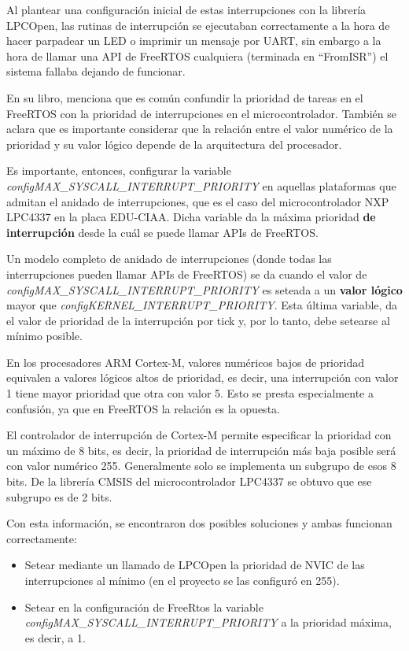 \documentclass{IEEEtran}
\begin{document}
Al plantear una configuración inicial de estas interrupciones con la librería LPCOpen, las rutinas de interrupción se ejecutaban correctamente a la hora de hacer parpadear un LED o imprimir un mensaje por UART, sin embargo a la hora de llamar una API de FreeRTOS cualquiera (terminada en ``FromISR'') el sistema fallaba dejando de funcionar.

En su libro, \textcite{FreeRTOS} menciona que es común confundir la prioridad de tareas en el FreeRTOS con la prioridad de interrupciones en el microcontrolador. También se aclara que es importante considerar que la relación entre el valor numérico de la prioridad y su valor lógico depende de la arquitectura del procesador.

Es importante, entonces, configurar la variable \textit{configMAX\_SYSCALL\_INTERRUPT\_PRIORITY} en aquellas plataformas que admitan el anidado de interrupciones, que es el caso del microcontrolador NXP LPC4337 en la placa EDU-CIAA. Dicha variable da la máxima prioridad \textbf{de interrupción} desde la cuál se puede llamar APIs de FreeRTOS.

Un modelo completo de anidado de interrupciones (donde todas las interrupciones pueden llamar APIs de FreeRTOS) se da cuando el valor de \textit{configMAX\_SYSCALL\_INTERRUPT\_PRIORITY} es seteada a un \textbf{valor lógico} mayor que \textit{configKERNEL\_INTERRUPT\_PRIORITY}. Esta última variable, da el valor de prioridad de la interrupción por tick y, por lo tanto, debe setearse al mínimo posible.

En los procesadores ARM Cortex-M, valores numéricos bajos de prioridad equivalen a valores lógicos altos de prioridad, es decir, una interrupción con valor 1 tiene mayor prioridad que otra con valor 5. Esto se presta especialmente a confusión, ya que en FreeRTOS la relación es la opuesta.

El controlador de interrupción de Cortex-M permite especificar la prioridad con un máximo de 8 bits, es decir, la prioridad de interrupción más baja posible será con valor numérico 255. Generalmente solo se implementa un subgrupo de esos 8 bits. De la librería CMSIS del microcontrolador LPC4337 se obtuvo que ese subgrupo es de 2 bits.

Con esta información, se encontraron dos posibles soluciones y ambas funcionan correctamente:

\begin{itemize}
    \item Setear mediante un llamado de LPCOpen la prioridad de NVIC de las interrupciones al mínimo (en el proyecto se las configuró en 255).
    \item Setear en la configuración de FreeRtos la variable \textit{configMAX\_SYSCALL\_INTERRUPT\_PRIORITY} a la prioridad máxima, es decir, a 1.
\end{itemize}
\end{document}
